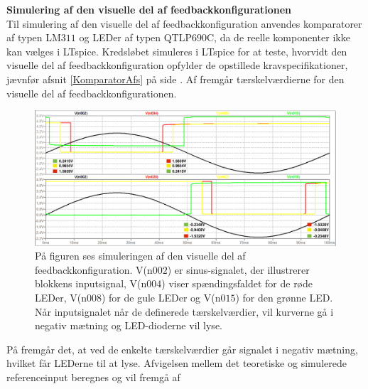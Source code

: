 \noindent\textbf{Simulering af den visuelle del af feedbackkonfigurationen} \\
Til simulering af den visuelle del af feedbackkonfiguration anvendes komparatorer af typen LM$311$ og LEDer af typen QTLP$690$C, da de reelle komponenter ikke kan vælges i LTspice. Kredsløbet simuleres i LTspice for at teste, hvorvidt den visuelle del af feedbackkonfiguration opfylder de opstillede kravspecifikationer, jævnfør afsnit \ref{KomparatorAfs} på side \pageref{KomparatorAfs}. Af  fremgår tærskelværdierne for den visuelle del af feedbackkonfigurationen. 

\begin{figure}[H]
	\centering
	\includegraphics[scale=0.3]{figures/cProblemloesning/komparator_visuel_simulering_samlet1.PNG}
	\caption{På figuren ses simuleringen af den visuelle del af feedbackkonfiguration. V(n$002$) er sinus-signalet, der illustrerer blokkens inputsignal, V(n$004$) viser spændingsfaldet for de røde LEDer, V(n$008$) for de gule LEDer og V(n$015$) for den grønne LED. Når inputsignalet når de definerede tærskelværdier, vil kurverne gå i negativ mætning og LED-dioderne vil lyse.}
	\label{fig:komparator_visuel_simulering_samlet1}
\end{figure}

\noindent På  fremgår det, at ved de enkelte tærskelværdier går signalet i negativ mætning, hvilket får LEDerne til at lyse. Afvigelsen mellem det teoretiske og simulerede referenceinput beregnes og vil fremgå af 

